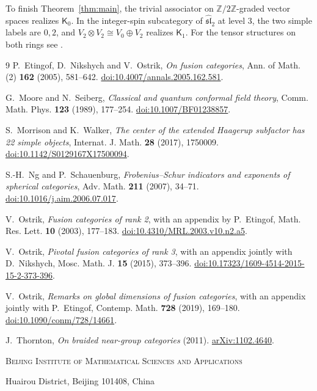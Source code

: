 \documentclass[11pt,a4paper]{article}
\newcommand{\Z}{\mathbb Z}
\newcommand{\Kn}{\mathsf K}
\numberwithin{equation}{section}
\begin{document}
To finish Theorem~\ref{thm:main}, the trivial associator on
$\Z/2\Z$-graded vector spaces realizes $\Kn_0$. In the integer-spin
subcategory of $\widehat{\mathfrak{sl}}_2$ at level $3$, the two
simple labels are $0,2$, and $V_2\otimes V_2\cong V_0\oplus V_2$
realizes $\Kn_1$. For the tensor structures on both rings see
\cite[Sections~2.4--2.5]{OstrikRank2}.

\begin{thebibliography}{9}
P.~Etingof, D.~Nikshych and V.~Ostrik,
\emph{On fusion categories}, Ann. of Math. (2) \textbf{162} (2005),
581--642. \href{https://doi.org/10.4007/annals.2005.162.581}{doi:10.4007/annals.2005.162.581}.

G.~Moore and N.~Seiberg, \emph{Classical and quantum conformal field
theory}, Comm. Math. Phys. \textbf{123} (1989), 177--254.
\href{https://doi.org/10.1007/BF01238857}{doi:10.1007/BF01238857}.

S.~Morrison and K.~Walker, \emph{The center of the extended Haagerup
subfactor has 22 simple objects}, Internat. J. Math. \textbf{28}
(2017), 1750009.
\href{https://doi.org/10.1142/S0129167X17500094}{doi:10.1142/S0129167X17500094}.

S.-H.~Ng and P.~Schauenburg,
\emph{Frobenius--Schur indicators and exponents of spherical categories},
Adv. Math. \textbf{211} (2007), 34--71.
\href{https://doi.org/10.1016/j.aim.2006.07.017}{doi:10.1016/j.aim.2006.07.017}.

V.~Ostrik, \emph{Fusion categories of rank 2}, with an appendix by
P.~Etingof, Math. Res. Lett. \textbf{10} (2003), 177--183.
\href{https://doi.org/10.4310/MRL.2003.v10.n2.a5}{doi:10.4310/MRL.2003.v10.n2.a5}.

V.~Ostrik, \emph{Pivotal fusion categories of rank 3}, with an appendix
jointly with D.~Nikshych, Mosc. Math. J. \textbf{15} (2015), 373--396.
\href{https://doi.org/10.17323/1609-4514-2015-15-2-373-396}{doi:10.17323/1609-4514-2015-15-2-373-396}.

V.~Ostrik, \emph{Remarks on global dimensions of fusion categories},
with an appendix jointly with P.~Etingof, Contemp. Math. \textbf{728}
(2019), 169--180. \href{https://doi.org/10.1090/conm/728/14661}{doi:10.1090/conm/728/14661}.

J.~Thornton, \emph{On braided near-group categories} (2011).
\href{https://arxiv.org/abs/1102.4640}{arXiv:1102.4640}.
\end{thebibliography}

\par\medskip
{\small\noindent\textsc{Beijing Institute of Mathematical Sciences and Applications}\par
\noindent Huairou District, Beijing 101408, China\par}
\end{document}
